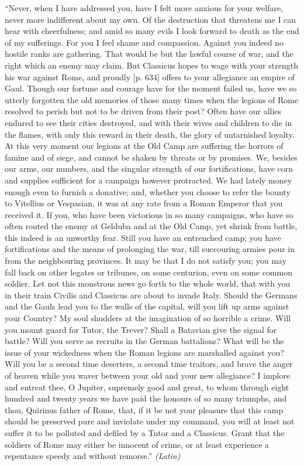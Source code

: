 ``Never, when I have addressed you, have I felt more anxious for your welfare, never more indifferent about my own. Of the destruction that threatens me I can hear with cheerfulness; and amid so many evils I look forward to death as the end of my sufferings. For you I feel shame and compassion. Against you indeed no hostile ranks are gathering. That would be but the lawful course of war, and the right which an enemy may claim. But Classicus hopes to wage with your strength his war against Rome, and proudly [p. 634] offers to your allegiance an empire of Gaul. Though our fortune and courage have for the moment failed us, have we so utterly forgotten the old memories of those many times when the legions of Rome resolved to perish but not to be driven from their post? Often have our allies endured to see their cities destroyed, and with their wives and children to die in the flames, with only this reward in their death, the glory of untarnished loyalty. At this very moment our legions at the Old Camp are suffering the horrors of famine and of siege, and cannot be shaken by threats or by promises. We, besides our arms, our numbers, and the singular strength of our fortifications, have corn and supplies sufficient for a campaign however protracted. We had lately money enough even to furnish a donative; and, whether you choose to refer the bounty to Vitellius or Vespasian, it was at any rate from a Roman Emperor that you received it. If you, who have been victorious in so many campaigns, who have so often routed the enemy at Gelduba and at the Old Camp, yet shrink from battle, this indeed is an unworthy fear. Still you have an entrenched camp; you have fortifications and the means of prolonging the war, till succouring armies pour in from the neighbouring provinces. It may be that I do not satisfy you; you may fall back on other legates or tribunes, on some centurion, even on some common soldier. Let not this monstrous news go forth to the whole world, that with you in their train Civilis and Classicus are about to invade Italy. Should the Germans and the Gauls lead you to the walls of the capital, will you lift up arms against your Country? My soul shudders at the imagination of so horrible a crime. Will you mount guard for Tutor, the Trever? Shall a Batavian give the signal for battle? Will you serve as recruits in the German battalions? What will be the issue of your wickedness when the Roman legions are marshalled against you? Will you be a second time deserters, a second time traitors, and brave the anger of heaven while you waver between your old and your new allegiance? I implore and entreat thee, O Jupiter, supremely good and great, to whom through eight hundred and twenty years we have paid the honours of so many triumphs, and thou, Quirinus father of Rome, that, if it be not your pleasure that this camp should be preserved pure and inviolate under my command, you will at least not suffer it to be polluted and defiled by a Tutor and a Classicus. Grant that the soldiers of Rome may either be innocent of crime, or at least experience a repentance speedy and without remorse.'' \emph{(Latin)}

